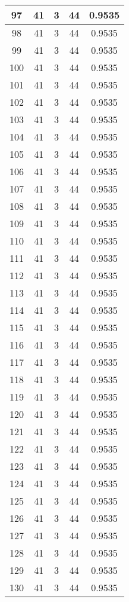 \documentclass[letterpaper, 12pt]{article}
\begin{document}
\begin{longtable}{|c|c|c|c|c|}
\hline
97 & 41 & 3 & 44 & 0.9535 \\
\hline
98 & 41 & 3 & 44 & 0.9535 \\
\hline
99 & 41 & 3 & 44 & 0.9535 \\
\hline
100 & 41 & 3 & 44 & 0.9535 \\
\hline
101 & 41 & 3 & 44 & 0.9535 \\
\hline
102 & 41 & 3 & 44 & 0.9535 \\
\hline
103 & 41 & 3 & 44 & 0.9535 \\
\hline
104 & 41 & 3 & 44 & 0.9535 \\
\hline
105 & 41 & 3 & 44 & 0.9535 \\
\hline
106 & 41 & 3 & 44 & 0.9535 \\
\hline
107 & 41 & 3 & 44 & 0.9535 \\
\hline
108 & 41 & 3 & 44 & 0.9535 \\
\hline
109 & 41 & 3 & 44 & 0.9535 \\
\hline
110 & 41 & 3 & 44 & 0.9535 \\
\hline
111 & 41 & 3 & 44 & 0.9535 \\
\hline
112 & 41 & 3 & 44 & 0.9535 \\
\hline
113 & 41 & 3 & 44 & 0.9535 \\
\hline
114 & 41 & 3 & 44 & 0.9535 \\
\hline
115 & 41 & 3 & 44 & 0.9535 \\
\hline
116 & 41 & 3 & 44 & 0.9535 \\
\hline
117 & 41 & 3 & 44 & 0.9535 \\
\hline
118 & 41 & 3 & 44 & 0.9535 \\
\hline
119 & 41 & 3 & 44 & 0.9535 \\
\hline
120 & 41 & 3 & 44 & 0.9535 \\
\hline
121 & 41 & 3 & 44 & 0.9535 \\
\hline
122 & 41 & 3 & 44 & 0.9535 \\
\hline
123 & 41 & 3 & 44 & 0.9535 \\
\hline
124 & 41 & 3 & 44 & 0.9535 \\
\hline
125 & 41 & 3 & 44 & 0.9535 \\
\hline
126 & 41 & 3 & 44 & 0.9535 \\
\hline
127 & 41 & 3 & 44 & 0.9535 \\
\hline
128 & 41 & 3 & 44 & 0.9535 \\
\hline
129 & 41 & 3 & 44 & 0.9535 \\
\hline
130 & 41 & 3 & 44 & 0.9535 \\

\end{longtable}
\end{document}
